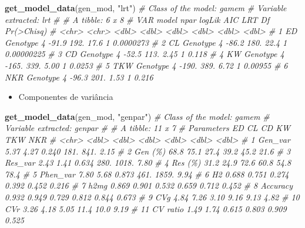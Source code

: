 \documentclass[
]{book}
\newenvironment{Shaded}{\begin{snugshade}}{\end{snugshade}}
\newcommand{\CommentTok}[1]{\textcolor[rgb]{0.56,0.35,0.01}{\textit{#1}}}
\newcommand{\KeywordTok}[1]{\textcolor[rgb]{0.13,0.29,0.53}{\textbf{#1}}}
\newcommand{\NormalTok}[1]{#1}
\newcommand{\StringTok}[1]{\textcolor[rgb]{0.31,0.60,0.02}{#1}}
\providecommand{\tightlist}{%
  \setlength{\itemsep}{0pt}\setlength{\parskip}{0pt}}
\numberwithin{equation}{section}
\begin{document}
\begin{Shaded}
\begin{Highlighting}[]
\KeywordTok{get\_model\_data}\NormalTok{(gen\_mod, }\StringTok{"lrt"}\NormalTok{)}
\CommentTok{\# Class of the model: gamem}
\CommentTok{\# Variable extracted: lrt}
\CommentTok{\# \# A tibble: 6 x 8}
\CommentTok{\#   VAR   model     npar logLik   AIC   LRT    Df \textasciigrave{}Pr(\textgreater{}Chisq)\textasciigrave{}}
\CommentTok{\#   \textless{}chr\textgreater{} \textless{}chr\textgreater{}    \textless{}dbl\textgreater{}  \textless{}dbl\textgreater{} \textless{}dbl\textgreater{} \textless{}dbl\textgreater{} \textless{}dbl\textgreater{}        \textless{}dbl\textgreater{}}
\CommentTok{\# 1 ED    Genotype     4  {-}91.9  192. 17.6      1   0.0000273 }
\CommentTok{\# 2 CL    Genotype     4  {-}86.2  180. 22.4      1   0.00000225}
\CommentTok{\# 3 CD    Genotype     4  {-}52.5  113.  2.45     1   0.118     }
\CommentTok{\# 4 KW    Genotype     4 {-}165.   339.  5.00     1   0.0253    }
\CommentTok{\# 5 TKW   Genotype     4 {-}190.   389.  6.72     1   0.00955   }
\CommentTok{\# 6 NKR   Genotype     4  {-}96.3  201.  1.53     1   0.216}
\end{Highlighting}
\end{Shaded}

\begin{itemize}
\tightlist
\item
  Componentes de variância
\end{itemize}

\begin{Shaded}
\begin{Highlighting}[]
\KeywordTok{get\_model\_data}\NormalTok{(gen\_mod, }\StringTok{"genpar"}\NormalTok{)}
\CommentTok{\# Class of the model: gamem}
\CommentTok{\# Variable extracted: genpar}
\CommentTok{\# \# A tibble: 11 x 7}
\CommentTok{\#    Parameters     ED     CL     CD      KW      TKW    NKR}
\CommentTok{\#    \textless{}chr\textgreater{}       \textless{}dbl\textgreater{}  \textless{}dbl\textgreater{}  \textless{}dbl\textgreater{}   \textless{}dbl\textgreater{}    \textless{}dbl\textgreater{}  \textless{}dbl\textgreater{}}
\CommentTok{\#  1 Gen\_var     5.37   4.27   0.240 181.     841.     2.15 }
\CommentTok{\#  2 Gen (\%)    68.8   75.1   27.4    39.2     45.2   21.6  }
\CommentTok{\#  3 Res\_var     2.43   1.41   0.634 280.    1018.     7.80 }
\CommentTok{\#  4 Res (\%)    31.2   24.9   72.6    60.8     54.8   78.4  }
\CommentTok{\#  5 Phen\_var    7.80   5.68   0.873 461.    1859.     9.94 }
\CommentTok{\#  6 H2          0.688  0.751  0.274   0.392    0.452  0.216}
\CommentTok{\#  7 h2mg        0.869  0.901  0.532   0.659    0.712  0.452}
\CommentTok{\#  8 Accuracy    0.932  0.949  0.729   0.812    0.844  0.673}
\CommentTok{\#  9 CVg         4.84   7.26   3.10    9.16     9.13   4.82 }
\CommentTok{\# 10 CVr         3.26   4.18   5.05   11.4     10.0    9.19 }
\CommentTok{\# 11 CV ratio    1.49   1.74   0.615   0.803    0.909  0.525}
\end{Highlighting}
\end{Shaded}
\end{document}
